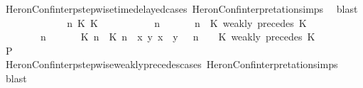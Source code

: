\begin{isabellebody}
\ HeronConf{\isacharunderscore}interp{\isacharunderscore}stepwise{\isacharunderscore}timedelayed{\isacharunderscore}cases\ HeronConf{\isacharunderscore}interpretation{\isachardot}simps\ \isamarkupfalse%
\ blast\isanewline
\ \ \ \ \isamarkupfalse%
\isanewline
\ \ \ \ \ \ \isamarkupfalse%
\ {\isasymGamma}\ n\ K\ K\ {\isasymPsi}\ {\isasymPhi}\isanewline
\ \ \ \ \ \ \isamarkupfalse%
\ {\isacartoucheopen}{\isacharparenleft}{\isasymGamma}\ n\ {\isasymturnstile}\ {\isasymPsi}\ {\isasymtriangleright}\ {\isasymPhi}\ {\isacharequal}\ {\isacharparenleft}{\isasymGamma}{\isacharcomma}\ n\ {\isasymturnstile}\ {\isacharparenleft}{\isacharparenleft}K\ weakly\ precedes\ K\ {\isacharhash}\ {\isasymPsi}{\isacharparenright}\ {\isasymtriangleright}\ {\isasymPhi}{\isacharparenright}{\isacartoucheclose}\isanewline
\ \ \ \ \ \ \ {\isacartoucheopen}{\isacharparenleft}{\isasymGamma}\ n\ {\isasymturnstile}\ {\isasymPsi}\ {\isasymtriangleright}\ {\isasymPhi}\ {\isacharequal}\ {\isacharparenleft}{\isacharparenleft}{\isacharparenleft}{\isasymlceil}{\isacharhash}\isactrlsup {\isasymle}\ K\ n{\isacharcomma}\ {\isacharhash}\isactrlsup {\isasymle}\ K\ n{\isasymrceil}\ {\isasymin}\ {\isacharparenleft}{\isasymlambda}{\isacharparenleft}x{\isacharcomma}\ y{\isacharparenright}{\isachardot}\ x\ {\isasymle}\ y{\isacharparenright}{\isacharparenright}\ {\isacharhash}\ {\isasymGamma}{\isacharparenright}{\isacharcomma}\ n\ {\isasymturnstile}\ {\isasymPsi}\ {\isasymtriangleright}\ {\isacharparenleft}{\isacharparenleft}K\ weakly\ precedes\ K\ {\isacharhash}\ {\isasymPhi}{\isacharparenright}{\isacharparenright}{\isacartoucheclose}\isanewline
\ \ \ \ \ \ \isamarkupfalse%
\ {\isacharquery}P\isanewline
\ \ \ \ \ \ \ \ \isamarkupfalse%
\ HeronConf{\isacharunderscore}interp{\isacharunderscore}stepwise{\isacharunderscore}weakly{\isacharunderscore}precedes{\isacharunderscore}cases\ HeronConf{\isacharunderscore}interpretation{\isachardot}simps\ \isamarkupfalse%
\ blast\isanewline

\end{isabellebody}
